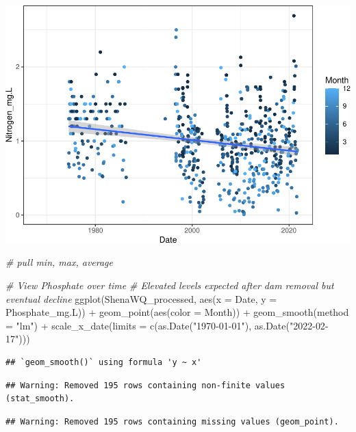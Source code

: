 \documentclass[
  12pt,
]{article}
\newenvironment{Shaded}{\begin{snugshade}}{\end{snugshade}}
\newcommand{\AttributeTok}[1]{\textcolor[rgb]{0.77,0.63,0.00}{#1}}
\newcommand{\CommentTok}[1]{\textcolor[rgb]{0.56,0.35,0.01}{\textit{#1}}}
\newcommand{\FunctionTok}[1]{\textcolor[rgb]{0.00,0.00,0.00}{#1}}
\newcommand{\NormalTok}[1]{#1}
\newcommand{\SpecialCharTok}[1]{\textcolor[rgb]{0.00,0.00,0.00}{#1}}
\newcommand{\StringTok}[1]{\textcolor[rgb]{0.31,0.60,0.02}{#1}}
\begin{document}
\includegraphics{Project_Template_files/figure-latex/unnamed-chunk-1-2.pdf}

\begin{Shaded}
\begin{Highlighting}[]
\CommentTok{\# pull min, max, average}

\CommentTok{\# View Phosphate over time}
\CommentTok{\# Elevated levels expected after dam removal but eventual decline}
\FunctionTok{ggplot}\NormalTok{(ShenaWQ\_processed, }\FunctionTok{aes}\NormalTok{(}\AttributeTok{x =}\NormalTok{ Date, }\AttributeTok{y =}\NormalTok{ Phosphate\_mg.L)) }\SpecialCharTok{+}
  \FunctionTok{geom\_point}\NormalTok{(}\FunctionTok{aes}\NormalTok{(}\AttributeTok{color =}\NormalTok{ Month)) }\SpecialCharTok{+}
  \FunctionTok{geom\_smooth}\NormalTok{(}\AttributeTok{method =} \StringTok{"lm"}\NormalTok{) }\SpecialCharTok{+}
  \FunctionTok{scale\_x\_date}\NormalTok{(}\AttributeTok{limits =} \FunctionTok{c}\NormalTok{(}\FunctionTok{as.Date}\NormalTok{(}\StringTok{"1970{-}01{-}01"}\NormalTok{), }
                          \FunctionTok{as.Date}\NormalTok{(}\StringTok{"2022{-}02{-}17"}\NormalTok{)))}
\end{Highlighting}
\end{Shaded}

\begin{verbatim}
## `geom_smooth()` using formula 'y ~ x'
\end{verbatim}

\begin{verbatim}
## Warning: Removed 195 rows containing non-finite values (stat_smooth).
\end{verbatim}

\begin{verbatim}
## Warning: Removed 195 rows containing missing values (geom_point).
\end{verbatim}
\end{document}
